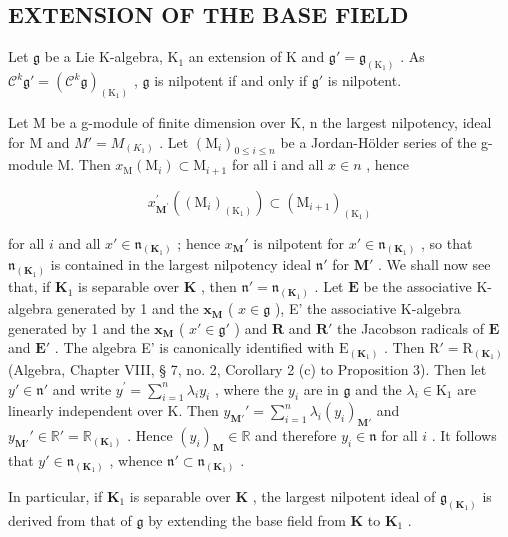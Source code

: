 \subsection{EXTENSION OF THE BASE FIELD}

Let \(\mathfrak{g}\) be a Lie K-algebra, \(\mathrm{K}_1\) an extension of K and \(\mathfrak{g}' = \mathfrak{g}_{(\mathrm{K}_1)}\) . As \(\mathcal{C}^k\mathfrak{g}' = (\mathcal{C}^k\mathfrak{g})_{(\mathrm{K}_1)}\) , \(\mathfrak{g}\) is nilpotent if and only if \(\mathfrak{g}'\) is nilpotent.

Let M be a g-module of finite dimension over K, n the largest nilpotency, ideal for M and \(M' = M_{(K_1)}\) . Let \((\mathrm{M}_i)_{0 \leq i \leq n}\) be a Jordan-Hölder series of the g-module M. Then \(x_{\mathrm{M}}(\mathrm{M}_i) \subset \mathrm{M}_{i+1}\) for all i and all \(x \in n\) , hence

\[
x _ {\mathbf {M} ^ {\prime}} ^ {\prime} \left(\left(\mathrm{M} _ {i}\right) _ {\left(\mathrm{K} _ {1}\right)}\right) \subset \left(\mathrm{M} _ {i + 1}\right) _ {\left(\mathrm{K} _ {1}\right)}
\]

for all \(i\) and all \(x' \in \mathfrak{n}_{(\mathbf{K}_1)}\) ; hence \(x_{\mathbf{M}}'\) is nilpotent for \(x' \in \mathfrak{n}_{(\mathbf{K}_1)}\) , so that \(\mathfrak{n}_{(\mathbf{K}_1)}\) is contained in the largest nilpotency ideal \(\mathfrak{n}'\) for \(\mathbf{M}'\) . We shall now see that, if \(\mathbf{K}_1\) is separable over \(\mathbf{K}\) , then \(\mathfrak{n}' = \mathfrak{n}_{(\mathbf{K}_1)}\) . Let \(\mathbf{E}\) be the associative K-algebra generated by 1 and the \(\mathbf{x}_{\mathbf{M}}\) ( \(x \in \mathfrak{g}\) ), E' the associative K-algebra generated by 1 and the \(\mathbf{x}_{\mathbf{M}}\) ( \(x' \in \mathfrak{g}'\) ) and \(\mathbf{R}\) and \(\mathbf{R}'\) the Jacobson radicals of \(\mathbf{E}\) and \(\mathbf{E}'\) . The algebra E' is canonically identified with \(\mathrm{E}_{(\mathbf{K}_1)}\) . Then \(\mathrm{R}' = \mathrm{R}_{(\mathbf{K}_1)}\) (Algebra, Chapter VIII, § 7, no. 2, Corollary 2 (c) to Proposition 3). Then let \(y' \in \mathfrak{n}'\) and write \(y^{\prime} = \sum_{i = 1}^{n}\lambda_{i}y_{i}\) , where the \(y_{i}\) are in \(\mathfrak{g}\) and the \(\lambda_{i}\in \mathrm{K}_{1}\) are linearly independent over K. Then \(y_{\mathbf{M}'}' = \sum_{i=1}^{n} \lambda_i(y_i)_{\mathbf{M}'}\) and \(y_{\mathbf{M}'}' \in \mathbb{R}' = \mathbb{R}_{(\mathbf{K}_1)}\) . Hence \((y_i)_{\mathbf{M}} \in \mathbb{R}\) and therefore \(y_i \in \mathfrak{n}\) for all \(i\) . It follows that \(y' \in \mathfrak{n}_{(\mathbf{K}_1)}\) , whence \(\mathfrak{n}' \subset \mathfrak{n}_{(\mathbf{K}_1)}\) .

In particular, if \(\mathbf{K}_1\) is separable over \(\mathbf{K}\) , the largest nilpotent ideal of \(\mathfrak{g}_{(\mathbf{K}_1)}\) is derived from that of \(\mathfrak{g}\) by extending the base field from \(\mathbf{K}\) to \(\mathbf{K}_1\) .

